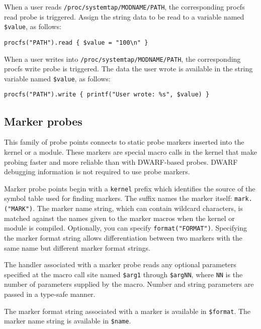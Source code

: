 \documentclass[twoside,english]{article}
\newenvironment{vindent}
{\begin{list}{}{\setlength{\listparindent}{6pt}}
\item[]}
{\end{list}}
\begin{document}
When a user reads \texttt{/proc/systemtap/MODNAME/PATH}, the
corresponding procfs read probe is triggered.  Assign the string data
to be read to a variable named \texttt{\$value}, as follows:
\begin{vindent}
\begin{verbatim}
procfs("PATH").read { $value = "100\n" }
\end{verbatim}
\end{vindent}

When a user writes into \texttt{/proc/systemtap/MODNAME/PATH}, the
corresponding procfs write probe is triggered.  The data the user
wrote is available in the string variable named \texttt{\$value}, as
follows:
\begin{vindent}
\begin{verbatim}
procfs("PATH").write { printf("User wrote: %s", $value) }
\end{verbatim}
\end{vindent}


\subsection{Marker probes}
This family of probe points connects to static probe markers inserted
into the kernel or a module. These markers are special macro calls in
the kernel that make probing faster and more reliable than with
DWARF-based probes.  DWARF debugging information is not required to
use probe markers.

Marker probe points begin with a \texttt{kernel} prefix which
identifies the source of the symbol table used for finding
markers. The suffix names the marker itself:
\texttt{mark.("MARK")}. The marker name string, which can contain
wildcard characters, is matched against the names given to the marker
macros when the kernel or module is compiled.  Optionally, you can
specify \texttt{format("FORMAT")}.  Specifying the marker format
string allows differentiation between two markers with the same name
but different marker format strings.

The handler associated with a marker probe reads any optional
parameters specified at the macro call site named \texttt{\$arg1}
through \texttt{\$argNN}, where \texttt{NN} is the number of
parameters supplied by the macro. Number and string parameters are
passed in a type-safe manner.

The marker format string associated with a marker is available in
\texttt{\$format}. The marker name string is available in
\texttt{\$name}.
\end{document}
